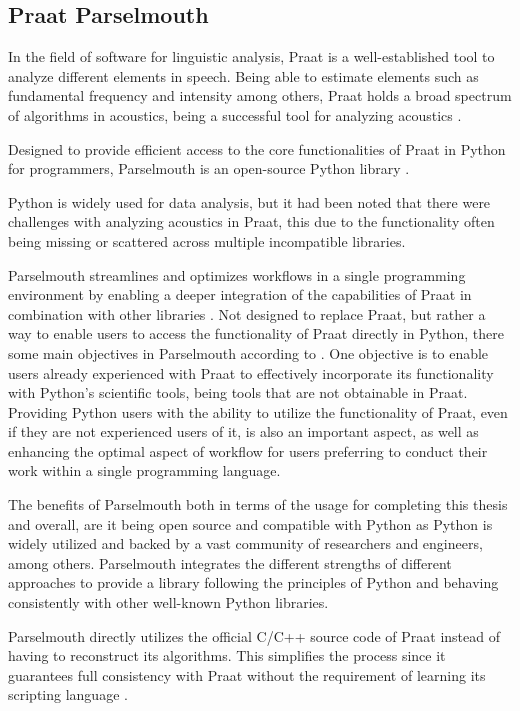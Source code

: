 \subsection{Praat Parselmouth}

In the field of software for linguistic analysis, Praat is a well-established tool to analyze different elements in speech. Being able to estimate elements such as fundamental frequency and intensity among others, Praat holds a broad spectrum of algorithms in acoustics, being a successful tool for analyzing acoustics \autocite{Jadoul2024}.

Designed to provide efficient access to the core functionalities of Praat in Python for programmers, Parselmouth is an open-source Python library \autocite{Jadoul2018}.

Python is widely used for data analysis, but it had been noted that there were challenges with analyzing acoustics in Praat, this due to the functionality often being missing or scattered across multiple incompatible libraries.

Parselmouth streamlines and optimizes workflows in a single programming environment by enabling a deeper integration of the capabilities of Praat in combination with other libraries \autocite{Jadoul2024}. Not designed to replace Praat, but rather a way to enable users to access the functionality of Praat directly in Python, there some main objectives in Parselmouth according to \autocite{Jadoul2018}.
One objective is to enable users already experienced with Praat to effectively incorporate its functionality with Python’s scientific tools, being tools that are not obtainable in Praat.
Providing Python users with the ability to utilize the functionality of Praat, even if they are not experienced users of it, is also an important aspect, as well as enhancing the optimal aspect of workflow for users preferring to conduct their work within a single programming language.
 
The benefits of Parselmouth both in terms of the usage for completing this thesis and overall, are it being open source and compatible with Python as Python is widely utilized and backed by a vast community of researchers and engineers, among others. Parselmouth integrates the different strengths of different approaches to provide a library following the principles of Python and behaving consistently with other well-known Python libraries.

Parselmouth directly utilizes the official C/C++ source code of Praat instead of having to reconstruct its algorithms. This simplifies the process since it guarantees full consistency with Praat without the requirement of learning its scripting language \autocite{Jadoul2018}.

